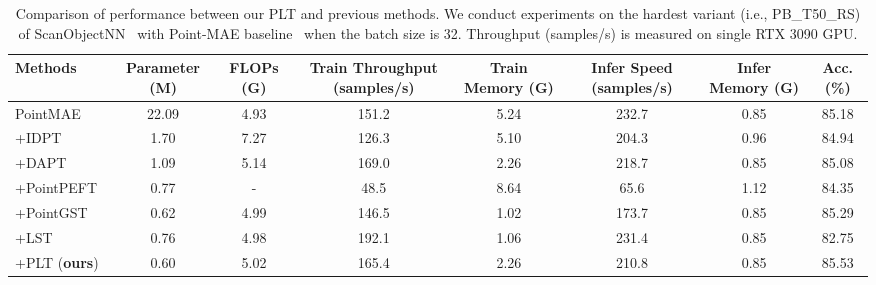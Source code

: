 \begin{table*}
  \centering
  \scriptsize
  \setlength{\tabcolsep}{2.4mm}
  \caption{Comparison of performance between our PLT and previous methods. We conduct experiments on the hardest variant (i.e., PB\_T50\_RS) of ScanObjectNN~\cite{uy2019revisiting} with Point-MAE baseline~\cite{pang2022masked} when the batch size is 32. Throughput (samples/s) is measured on single RTX 3090 GPU.}
    \begin{tabular}{lccccccc}
    \toprule
    Methods & Parameter (M) & FLOPs (G) & Train Throughput (samples/s) & Train Memory (G) & Infer Speed (samples/s) & Infer Memory (G) & Acc. (\%) \\
    \midrule
    PointMAE~\cite{pang2022masked} & 22.09 & 4.93 & 151.2 & 5.24 & 232.7 & 0.85 & 85.18 \\
    +IDPT~\cite{zha2023instance} & 1.70 & 7.27 & 126.3 & 5.10 & 204.3 & 0.96 & 84.94 \\
    +DAPT~\cite{zhou2024dynamic} & 1.09 & 5.14 & 169.0 & 2.26 & 218.7 & 0.85 & 85.08 \\
    +PointPEFT~\cite{tang2024point} & 0.77 & - & 48.5 & 8.64 & 65.6 & 1.12 & 84.35 \\
    +PointGST~\cite{liang2024parameter} & 0.62 & 4.99 & 146.5 & 1.02 & 173.7 & 0.85 & 85.29 \\
    +LST~\cite{sung2022lst} & 0.76 & 4.98 & 192.1 & 1.06 & 231.4 & 0.85 & 82.75 \\
    +PLT (\textbf{ours}) & 0.60 & 5.02 & 165.4 & 2.26 & 210.8 & 0.85 & 85.53\\
    \bottomrule
    \end{tabular}
  \label{tab:performance}
\end{table*}